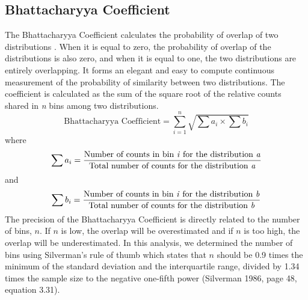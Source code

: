 \subsection{Bhattacharyya Coefficient}
The Bhattacharyya Coefficient calculates the probability of overlap of two distributions \citep{Bhattacharyya}. When it is equal to zero, the probability of overlap of the distributions is also zero, and when it is equal to one, the two distributions are entirely overlapping. It forms an elegant and easy to compute continuous measurement of the probability of similarity between two distributions. The coefficient is calculated as the sum of the square root of the relative counts shared in \textit{n} bins among two distributions.
\begin{equation}
\text{Bhattacharyya Coefficient}=\sum_{i=1}^{n} \sqrt{{\sum{a_i}}\times{\sum{b_i}}}
\end{equation}
where
\begin{equation}
\sum{a_i}=\frac{\text{Number of counts in bin \textit{i} for the distribution \textit{a}}}{\text{Total number of counts for the distribution \textit{a}}}
\end{equation}
and
\begin{equation}
\sum{b_i}=\frac{\text{Number of counts in bin \textit{i} for the distribution \textit{b}}}{\text{Total number of counts for the distribution \textit{b}}}
\end{equation}
The precision of the Bhattacharyya Coefficient is directly related to the number of bins, $n$. If $n$ is low, the overlap will be overestimated and if $n$ is too high, the overlap will be underestimated. In this analysis, we determined the number of bins using Silverman's rule of thumb which states that $n$ should be 0.9 times the minimum of the standard deviation and the interquartile range, %
divided by 1.34 times the sample size %
to the negative one-fifth power (Silverman 1986, page 48, equation 3.31).




